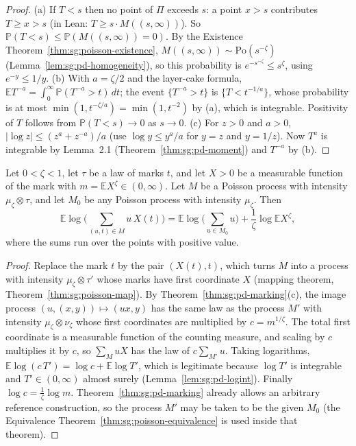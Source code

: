 \begin{proof}
  \leanok
{}
(a) If $T<s$ then no point of $\Pi$ exceeds $s$: a point $x>s$ contributes $T\ge x>s$ (in Lean: $T\ge s\cdot M((s,\infty))$). So $\mathbb P(T<s)\le\mathbb P(M((s,\infty))=0)$. By the Existence Theorem~\ref{thm:sg:poisson-existence}, $M((s,\infty))\sim\mathrm{Po}(s^{-\zeta})$ (Lemma~\ref{lem:sg:pd-homogeneity}), so this probability is $e^{-s^{-\zeta}}\le s^{\zeta}$, using $e^{-y}\le1/y$. (b) With $a=\zeta/2$ and the layer-cake formula, $\mathbb ET^{-a}=\int_0^\infty\mathbb P(T^{-a}>t)\,dt$; the event $\{T^{-a}>t\}$ is $\{T<t^{-1/a}\}$, whose probability is at most $\min(1,t^{-\zeta/a})=\min(1,t^{-2})$ by (a), which is integrable. Positivity of $T$ follows from $\mathbb P(T<s)\to0$ as $s\to0$. (c) For $z>0$ and $a>0$, $|\log z|\le(z^a+z^{-a})/a$ (use $\log y\le y^a/a$ for $y=z$ and $y=1/z$). Now $T^{a}$ is integrable by Lemma~2.1 (Theorem~\ref{thm:sg:pd-moment}) and $T^{-a}$ by (b).
\end{proof}

\begin{theorem}\label{thm:sg:pd-logsum}
  \leanok
Let $0<\zeta<1$, let $\tau$ be a law of marks $t$, and let $X>0$ be a measurable function of the mark with $m=\mathbb EX^\zeta\in(0,\infty)$. Let $M$ be a Poisson process with intensity $\mu_\zeta\otimes\tau$, and let $M_0$ be any Poisson process with intensity $\mu_\zeta$. Then
\[\mathbb E\log\Big(\sum_{(u,t)\in M}u\,X(t)\Big)=\mathbb E\log\Big(\sum_{u\in M_0}u\Big)+\frac1\zeta\log\mathbb EX^\zeta,\]
where the sums run over the points with positive value.
\end{theorem}

\begin{proof}
  \leanok
{}
Replace the mark $t$ by the pair $(X(t),t)$, which turns $M$ into a process with intensity $\mu_\zeta\otimes\tau'$ whose marks have first coordinate $X$ (mapping theorem, Theorem~\ref{thm:sg:poisson-map}). By Theorem~\ref{thm:sg:pd-marking}(c), the image process $(u,(x,y))\mapsto(ux,y)$ has the same law as the process $M'$ with intensity $\mu_\zeta\otimes\nu_\zeta$ whose first coordinates are multiplied by $c=m^{1/\zeta}$. The total first coordinate is a measurable function of the counting measure, and scaling by $c$ multiplies it by $c$, so $\sum_{M}uX$ has the law of $c\sum_{M'}u$. Taking logarithms, $\mathbb E\log(c\,T')=\log c+\mathbb E\log T'$, which is legitimate because $\log T'$ is integrable and $T'\in(0,\infty)$ almost surely (Lemma~\ref{lem:sg:pd-logint}). Finally $\log c=\frac1\zeta\log m$. Theorem~\ref{thm:sg:pd-marking} already allows an arbitrary reference construction, so the process $M'$ may be taken to be the given $M_0$ (the Equivalence Theorem~\ref{thm:sg:poisson-equivalence} is used inside that theorem).
\end{proof}

